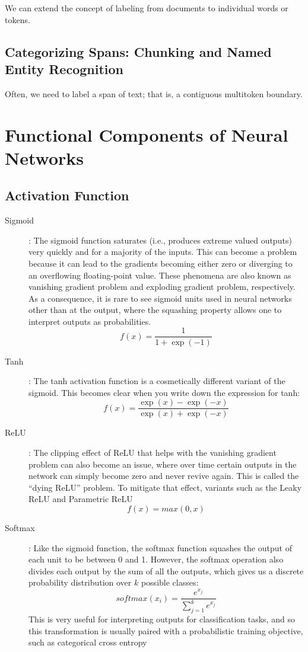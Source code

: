 \documentclass[french]{article}
\begin{document}
We can extend the concept of labeling from documents to individual words or tokens.

\subsection{Categorizing Spans: Chunking and Named Entity Recognition}

Often, we need to label a span of text; that is, a contiguous multitoken boundary.

\section{Functional Components of Neural Networks}

\subsection{Activation Function}

\begin{description}
    \item[Sigmoid]: The sigmoid function saturates (i.e., produces extreme valued outputs) very quickly and for a majority of the inputs. This can become a problem because it can lead to the gradients becoming either zero or diverging to an overflowing floating-point value. These phenomena are also known as vanishing gradient problem and exploding gradient problem, respectively. As a consequence, it is rare to see sigmoid units used in neural networks other than at the output, where the squashing property allows one to interpret outputs as probabilities.
        \[f(x) = \frac{1}{1+\exp(-1)}\]
    \item[Tanh]: The tanh activation function is a cosmetically different variant of the sigmoid. This becomes clear when you write down the expression for tanh:
        \[f(x) = \frac{\exp(x) - \exp(-x)}{\exp(x) + \exp(-x)}\]
    \item[ReLU]: The clipping effect of ReLU that helps with the vanishing gradient problem can also become an issue, where over time certain outputs in the network can simply become zero and never revive again. This is called the “dying ReLU” problem. To mitigate that effect, variants such as the Leaky ReLU and Parametric ReLU
        \[f(x) = max(0, x)\]
    \item[Softmax]: Like the sigmoid function, the softmax function squashes the output of each unit to be between 0 and 1. However, the softmax operation also divides each output by the sum of all the outputs, which gives us a discrete probability distribution over $k$ possible classes:
        \[softmax(x_i) = \frac{e^{x_j}}{\sum_{j=1}^ke^{x_j}}\]
    This is very useful for interpreting outputs for classification tasks, and so this transformation is usually paired with a probabilistic training objective, such as categorical cross entropy
\end{description}
\end{document}
